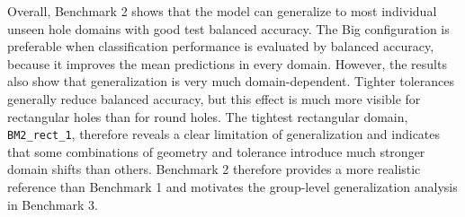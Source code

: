 Overall, Benchmark 2 shows that the model can generalize to most individual unseen hole domains with good test balanced accuracy. The Big configuration is preferable when classification performance is evaluated by balanced accuracy, because it improves the mean predictions in every domain. However, the results also show that generalization is very much domain-dependent. Tighter tolerances generally reduce balanced accuracy, but this effect is much more visible for rectangular holes than for round holes. The tightest rectangular domain, \texttt{BM2\_rect\_1}, therefore reveals a clear limitation of generalization and indicates that some combinations of geometry and tolerance introduce much stronger domain shifts than others. Benchmark 2 therefore provides a more realistic reference than Benchmark 1 and motivates the group-level generalization analysis in Benchmark 3.



